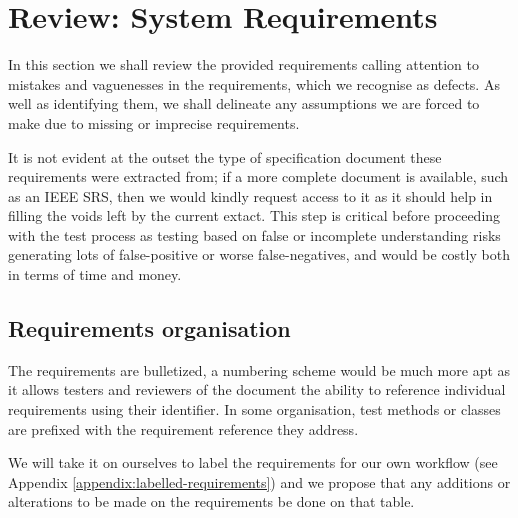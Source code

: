 \section{Review: System Requirements}

In this section we shall review the provided requirements calling attention to mistakes and vaguenesses in the requirements, which we recognise as defects. As well as identifying them, we shall delineate any assumptions we are forced to make due to missing or imprecise requirements. 

It is not evident at the outset the type of specification document these requirements were extracted from; if a more complete document is available, such as an IEEE SRS, then we would kindly request access to it as it should help in filling the voids left by the current extact.  
This step is critical before proceeding with the test process as testing based on false or incomplete understanding risks generating lots of false-positive or worse false-negatives, and would be costly both in terms of time and money. 
\par

\subsection{Requirements organisation}
The requirements are bulletized, a numbering scheme would be much more apt as it allows testers and reviewers of the document the ability to reference individual requirements using their identifier. In some organisation, test methods or classes are prefixed with the requirement reference they address. 

We will take it on ourselves to label the requirements for our own workflow (see Appendix \ref{appendix:labelled-requirements}) and we propose that any additions or alterations to be made on the requirements be done on that table.


